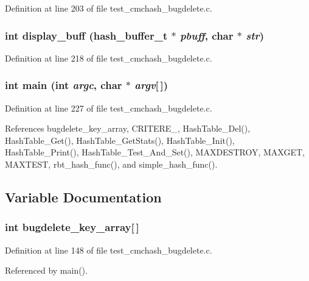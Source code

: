 Definition at line 203 of file test\_\-cmchash\_\-bugdelete.c.
\subsubsection{\setlength{\rightskip}{0pt plus 5cm}int display\_\-buff (hash\_\-buffer\_\-t $\ast$ {\em pbuff}, char $\ast$ {\em str})}\label{test__cmchash__bugdelete_8c_a9}




Definition at line 218 of file test\_\-cmchash\_\-bugdelete.c.
\subsubsection{\setlength{\rightskip}{0pt plus 5cm}int main (int {\em argc}, char $\ast$ {\em argv}[$\,$])}\label{test__cmchash__bugdelete_8c_a13}




Definition at line 227 of file test\_\-cmchash\_\-bugdelete.c.

References bugdelete\_\-key\_\-array, CRITERE\_, Hash\-Table\_\-Del(), Hash\-Table\_\-Get(), Hash\-Table\_\-Get\-Stats(), Hash\-Table\_\-Init(), Hash\-Table\_\-Print(), Hash\-Table\_\-Test\_\-And\_\-Set(), MAXDESTROY, MAXGET, MAXTEST, rbt\_\-hash\_\-func(), and simple\_\-hash\_\-func().

\subsection{Variable Documentation}
\subsubsection{\setlength{\rightskip}{0pt plus 5cm}int {\bf bugdelete\_\-key\_\-array}[$\,$]}\label{test__cmchash__bugdelete_8c_a7}




Definition at line 148 of file test\_\-cmchash\_\-bugdelete.c.

Referenced by main().